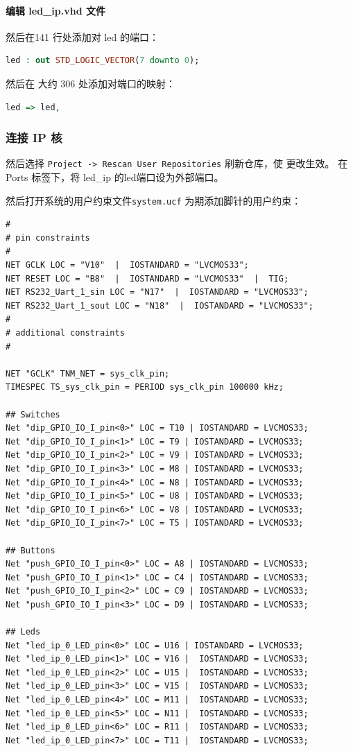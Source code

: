 \documentclass{ctexart}
\begin{document}
\paragraph{编辑 led\_ip.vhd 文件}

然后在141 行处添加对 led 的端口：
\begin{lstlisting}[language=VHDL]
led : out STD_LOGIC_VECTOR(7 downto 0);
\end{lstlisting}

然后在 大约 306 处添加对端口的映射：
\begin{lstlisting}[language=VHDL]
led => led,
\end{lstlisting}

\subsubsection{连接 IP 核}

然后选择 \verb|Project -> Rescan User Repositories| 刷新仓库，使
更改生效。
在 Ports 标签下，将 led\_ip 的led端口设为外部端口。

然后打开系统的用户约束文件\verb|system.ucf| 为期添加脚针的用户约束：
\begin{lstlisting}
#
# pin constraints
#
NET GCLK LOC = "V10"  |  IOSTANDARD = "LVCMOS33";
NET RESET LOC = "B8"  |  IOSTANDARD = "LVCMOS33"  |  TIG;
NET RS232_Uart_1_sin LOC = "N17"  |  IOSTANDARD = "LVCMOS33";
NET RS232_Uart_1_sout LOC = "N18"  |  IOSTANDARD = "LVCMOS33";
#
# additional constraints
#

NET "GCLK" TNM_NET = sys_clk_pin;
TIMESPEC TS_sys_clk_pin = PERIOD sys_clk_pin 100000 kHz;

## Switches
Net "dip_GPIO_IO_I_pin<0>" LOC = T10 | IOSTANDARD = LVCMOS33;
Net "dip_GPIO_IO_I_pin<1>" LOC = T9 | IOSTANDARD = LVCMOS33;
Net "dip_GPIO_IO_I_pin<2>" LOC = V9 | IOSTANDARD = LVCMOS33;
Net "dip_GPIO_IO_I_pin<3>" LOC = M8 | IOSTANDARD = LVCMOS33;
Net "dip_GPIO_IO_I_pin<4>" LOC = N8 | IOSTANDARD = LVCMOS33;
Net "dip_GPIO_IO_I_pin<5>" LOC = U8 | IOSTANDARD = LVCMOS33;
Net "dip_GPIO_IO_I_pin<6>" LOC = V8 | IOSTANDARD = LVCMOS33;
Net "dip_GPIO_IO_I_pin<7>" LOC = T5 | IOSTANDARD = LVCMOS33;

## Buttons
Net "push_GPIO_IO_I_pin<0>" LOC = A8 | IOSTANDARD = LVCMOS33;
Net "push_GPIO_IO_I_pin<1>" LOC = C4 | IOSTANDARD = LVCMOS33;
Net "push_GPIO_IO_I_pin<2>" LOC = C9 | IOSTANDARD = LVCMOS33;
Net "push_GPIO_IO_I_pin<3>" LOC = D9 | IOSTANDARD = LVCMOS33;

## Leds
Net "led_ip_0_LED_pin<0>" LOC = U16 | IOSTANDARD = LVCMOS33; 
Net "led_ip_0_LED_pin<1>" LOC = V16 |  IOSTANDARD = LVCMOS33; 
Net "led_ip_0_LED_pin<2>" LOC = U15 |  IOSTANDARD = LVCMOS33; 
Net "led_ip_0_LED_pin<3>" LOC = V15 |  IOSTANDARD = LVCMOS33; 
Net "led_ip_0_LED_pin<4>" LOC = M11 |  IOSTANDARD = LVCMOS33; 
Net "led_ip_0_LED_pin<5>" LOC = N11 |  IOSTANDARD = LVCMOS33;
Net "led_ip_0_LED_pin<6>" LOC = R11 |  IOSTANDARD = LVCMOS33; 
Net "led_ip_0_LED_pin<7>" LOC = T11 |  IOSTANDARD = LVCMOS33;
\end{lstlisting}
\end{document}
